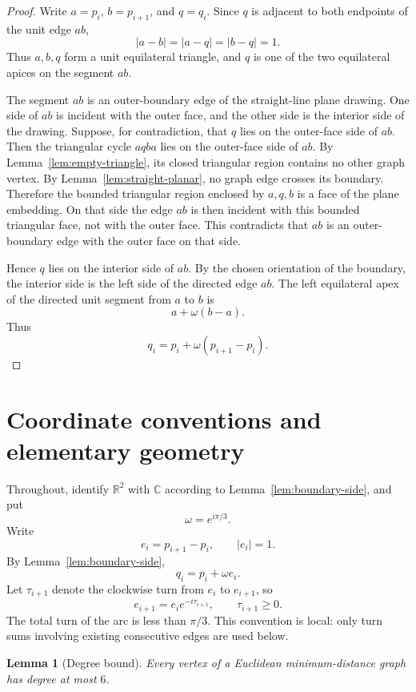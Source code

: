 \documentclass[11pt]{article}
\theoremstyle{plain}
\newtheorem{lemma}{Lemma}
\numberwithin{equation}{section}
\newcommand{\RR}{\mathbb{R}}
\newcommand{\CC}{\mathbb{C}}
\begin{document}
\begin{proof}
Write $a=p_i$, $b=p_{i+1}$, and $q=q_i$. Since $q$ is adjacent to both endpoints of the unit edge $ab$,
\[
 |a-b|=|a-q|=|b-q|=1.
\]
Thus $a,b,q$ form a unit equilateral triangle, and $q$ is one of the two equilateral apices on the segment $ab$.

The segment $ab$ is an outer-boundary edge of the straight-line plane drawing. One side of $ab$ is incident with the outer face, and the other side is the interior side of the drawing. Suppose, for contradiction, that $q$ lies on the outer-face side of $ab$. Then the triangular cycle $a q b a$ lies on the outer-face side of $ab$. By Lemma~\ref{lem:empty-triangle}, its closed triangular region contains no other graph vertex. By Lemma~\ref{lem:straight-planar}, no graph edge crosses its boundary. Therefore the bounded triangular region enclosed by $a,q,b$ is a face of the plane embedding. On that side the edge $ab$ is then incident with this bounded triangular face, not with the outer face. This contradicts that $ab$ is an outer-boundary edge with the outer face on that side.

Hence $q$ lies on the interior side of $ab$. By the chosen orientation of the boundary, the interior side is the left side of the directed edge $ab$. The left equilateral apex of the directed unit segment from $a$ to $b$ is
\[
 a+\omega(b-a).
\]
Thus
\[
 q_i=p_i+\omega(p_{i+1}-p_i).
\]
\end{proof}

\section{Coordinate conventions and elementary geometry}

Throughout, identify $\RR^2$ with $\CC$ according to Lemma~\ref{lem:boundary-side}, and put
\[
 \omega=e^{i\pi/3}.
\]
Write
\[
 e_i=p_{i+1}-p_i,
 \qquad |e_i|=1.
\]
By Lemma~\ref{lem:boundary-side},
\[
 q_i=p_i+\omega e_i.
\]
Let $\tau_{i+1}$ denote the clockwise turn from $e_i$ to $e_{i+1}$, so
\[
 e_{i+1}=e_i e^{-i\tau_{i+1}},
 \qquad \tau_{i+1}\ge0.
\]
The total turn of the arc is less than $\pi/3$. This convention is local: only turn sums involving existing consecutive edges are used below.

\begin{lemma}[Degree bound]\label{lem:degree6}
Every vertex of a Euclidean minimum-distance graph has degree at most $6$.
\end{lemma}
\end{document}
